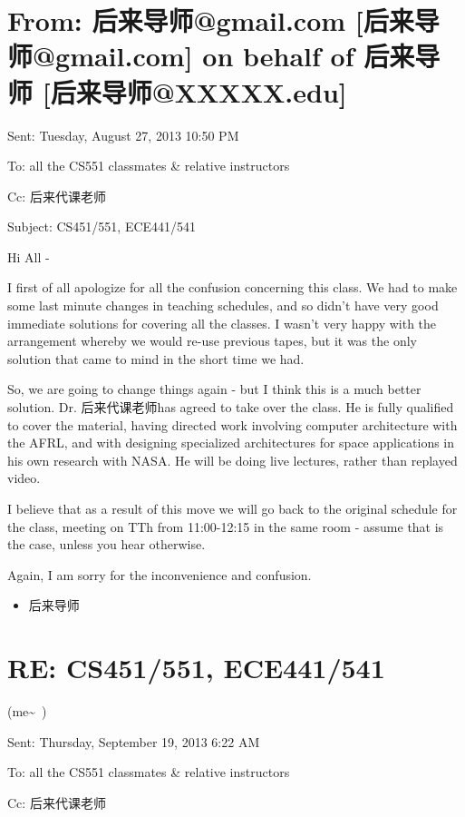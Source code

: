 \documentclass[12pt]{book}
\begin{document}
\section{From: 后来导师@gmail.com [后来导师@gmail.com] on behalf of 后来导师 [后来导师@XXXXX.edu]}
\label{sec-12-1}
Sent: Tuesday, August 27, 2013 10:50 PM

To: all the CS551 classmates \& relative instructors

Cc: 后来代课老师

Subject: CS451/551, ECE441/541

Hi All -

I first of all apologize for all the confusion concerning this class. We had to make some last minute changes in teaching schedules, and so didn't have very good immediate solutions for covering all the classes. I wasn't very happy with the arrangement whereby we would re-use previous tapes, but it was the only solution that came to mind in the short time we had.

So, we are going to change things again - but I think this is a much better solution. Dr. 后来代课老师has agreed to take over the class. He is fully qualified to cover the material, having directed work involving computer architecture with the AFRL, and with designing specialized architectures for space applications in his own research with NASA. He will be doing live lectures, rather than replayed video.

I believe that as a result of this move we will go back to the original schedule for the class, meeting on TTh from 11:00-12:15 in the same room - assume that is the case, unless you hear otherwise.

Again, I am sorry for the inconvenience and confusion.

\begin{itemize}
\item 后来导师
\end{itemize}


\section{RE: CS451/551, ECE441/541}
\label{sec-12-2}

(me\textasciitilde{}~)

Sent:         Thursday, September 19, 2013 6:22 AM

To:         all the CS551 classmates \& relative instructors

Cc: 后来代课老师
\end{document}
